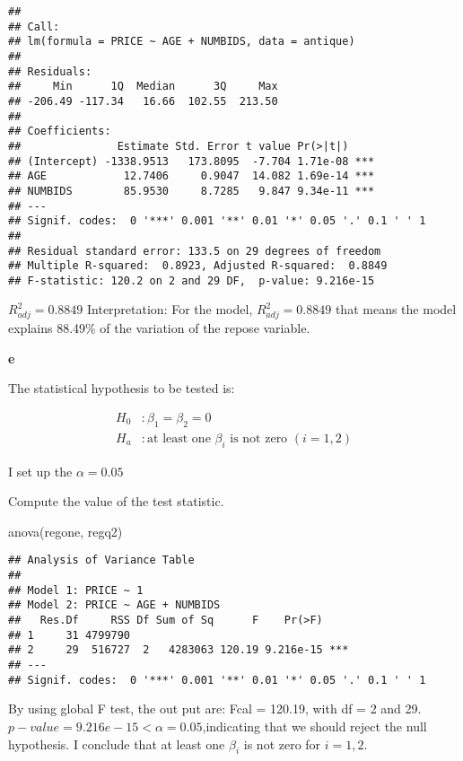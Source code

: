 \documentclass[
]{article}
\newenvironment{Shaded}{\begin{snugshade}}{\end{snugshade}}
\newcommand{\FunctionTok}[1]{\textcolor[rgb]{0.00,0.00,0.00}{#1}}
\newcommand{\NormalTok}[1]{#1}
\begin{document}
\begin{verbatim}
## 
## Call:
## lm(formula = PRICE ~ AGE + NUMBIDS, data = antique)
## 
## Residuals:
##     Min      1Q  Median      3Q     Max 
## -206.49 -117.34   16.66  102.55  213.50 
## 
## Coefficients:
##               Estimate Std. Error t value Pr(>|t|)    
## (Intercept) -1338.9513   173.8095  -7.704 1.71e-08 ***
## AGE            12.7406     0.9047  14.082 1.69e-14 ***
## NUMBIDS        85.9530     8.7285   9.847 9.34e-11 ***
## ---
## Signif. codes:  0 '***' 0.001 '**' 0.01 '*' 0.05 '.' 0.1 ' ' 1
## 
## Residual standard error: 133.5 on 29 degrees of freedom
## Multiple R-squared:  0.8923, Adjusted R-squared:  0.8849 
## F-statistic: 120.2 on 2 and 29 DF,  p-value: 9.216e-15
\end{verbatim}

\(R^2_{adj} = 0.8849\) Interpretation: For the model,
\(R^2_{adj} = 0.8849\) that means the model explains 88.49\% of the
variation of the repose variable.

\textbf{e}

The statistical hypothesis to be tested is:

\[
\begin{aligned}
H_0&:\beta_1=\beta_2=0\\
H_a&:\mbox{at least one }\beta_i\mbox{ is not zero } (i=1,2) 
\end{aligned}
\]

I set up the \(\alpha = 0.05\)

Compute the value of the test statistic.

\begin{Shaded}
\begin{Highlighting}[]
\FunctionTok{anova}\NormalTok{(regone, regq2)}
\end{Highlighting}
\end{Shaded}

\begin{verbatim}
## Analysis of Variance Table
## 
## Model 1: PRICE ~ 1
## Model 2: PRICE ~ AGE + NUMBIDS
##   Res.Df     RSS Df Sum of Sq      F    Pr(>F)    
## 1     31 4799790                                  
## 2     29  516727  2   4283063 120.19 9.216e-15 ***
## ---
## Signif. codes:  0 '***' 0.001 '**' 0.01 '*' 0.05 '.' 0.1 ' ' 1
\end{verbatim}

By using global F test, the out put are: Fcal = 120.19, with df = 2 and
29. \(p-value= 9.216e-15 < \alpha=0.05\),indicating that we should
reject the null hypothesis. I conclude that at least one \(β_i\) is not
zero for \(i=1,2\).
\end{document}
